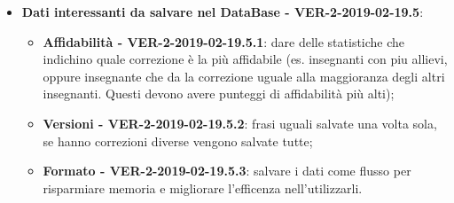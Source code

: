 \documentclass[a4paper, oneside, openany, dvipsnames, table]{article}
\begin{document}
\begin{itemize}
	\item \textbf{Dati interessanti da salvare nel DataBase - VER-2-2019-02-19.5}:
	\begin{itemize}
		\item \textbf{Affidabilità - VER-2-2019-02-19.5.1}: dare delle statistiche che indichino quale correzione è la più affidabile
		(es. insegnanti con piu allievi, oppure insegnante che da la correzione uguale alla maggioranza degli 
		altri insegnanti. Questi devono avere punteggi di affidabilità più alti); 
		\item \textbf{Versioni - VER-2-2019-02-19.5.2}: frasi uguali salvate una volta sola, se hanno correzioni diverse vengono salvate tutte;
		\item \textbf{Formato - VER-2-2019-02-19.5.3}: salvare i dati come flusso per risparmiare memoria e migliorare l'efficenza nell'utilizzarli.
	\end{itemize}

\end{itemize}
\end{document}
